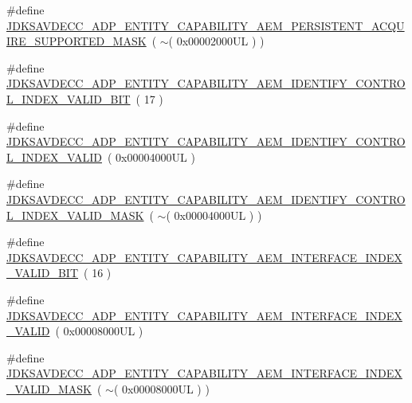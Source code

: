 \begin{DoxyCompactItemize}
\item 
\#define \hyperlink{group__adp__entity__capability_gadef932c36c7432245d44c7ad2d978595}{J\+D\+K\+S\+A\+V\+D\+E\+C\+C\+\_\+\+A\+D\+P\+\_\+\+E\+N\+T\+I\+T\+Y\+\_\+\+C\+A\+P\+A\+B\+I\+L\+I\+T\+Y\+\_\+\+A\+E\+M\+\_\+\+P\+E\+R\+S\+I\+S\+T\+E\+N\+T\+\_\+\+A\+C\+Q\+U\+I\+R\+E\+\_\+\+S\+U\+P\+P\+O\+R\+T\+E\+D\+\_\+\+M\+A\+SK}~( $\sim$( 0x00002000\+U\+L ) )
\item 
\#define \hyperlink{group__adp__entity__capability_gaf16680ff1efc8a1c4d343251b210a128}{J\+D\+K\+S\+A\+V\+D\+E\+C\+C\+\_\+\+A\+D\+P\+\_\+\+E\+N\+T\+I\+T\+Y\+\_\+\+C\+A\+P\+A\+B\+I\+L\+I\+T\+Y\+\_\+\+A\+E\+M\+\_\+\+I\+D\+E\+N\+T\+I\+F\+Y\+\_\+\+C\+O\+N\+T\+R\+O\+L\+\_\+\+I\+N\+D\+E\+X\+\_\+\+V\+A\+L\+I\+D\+\_\+\+B\+IT}~( 17 )
\item 
\#define \hyperlink{group__adp__entity__capability_gaa5c00396d204182da88d5010de83d19a}{J\+D\+K\+S\+A\+V\+D\+E\+C\+C\+\_\+\+A\+D\+P\+\_\+\+E\+N\+T\+I\+T\+Y\+\_\+\+C\+A\+P\+A\+B\+I\+L\+I\+T\+Y\+\_\+\+A\+E\+M\+\_\+\+I\+D\+E\+N\+T\+I\+F\+Y\+\_\+\+C\+O\+N\+T\+R\+O\+L\+\_\+\+I\+N\+D\+E\+X\+\_\+\+V\+A\+L\+ID}~( 0x00004000\+U\+L )
\item 
\#define \hyperlink{group__adp__entity__capability_ga361d96d5c4e60c0e0cfdbef6b82e44b7}{J\+D\+K\+S\+A\+V\+D\+E\+C\+C\+\_\+\+A\+D\+P\+\_\+\+E\+N\+T\+I\+T\+Y\+\_\+\+C\+A\+P\+A\+B\+I\+L\+I\+T\+Y\+\_\+\+A\+E\+M\+\_\+\+I\+D\+E\+N\+T\+I\+F\+Y\+\_\+\+C\+O\+N\+T\+R\+O\+L\+\_\+\+I\+N\+D\+E\+X\+\_\+\+V\+A\+L\+I\+D\+\_\+\+M\+A\+SK}~( $\sim$( 0x00004000\+U\+L ) )
\item 
\#define \hyperlink{group__adp__entity__capability_ga47da285cb2190efe4f7c862b60c2f99b}{J\+D\+K\+S\+A\+V\+D\+E\+C\+C\+\_\+\+A\+D\+P\+\_\+\+E\+N\+T\+I\+T\+Y\+\_\+\+C\+A\+P\+A\+B\+I\+L\+I\+T\+Y\+\_\+\+A\+E\+M\+\_\+\+I\+N\+T\+E\+R\+F\+A\+C\+E\+\_\+\+I\+N\+D\+E\+X\+\_\+\+V\+A\+L\+I\+D\+\_\+\+B\+IT}~( 16 )
\item 
\#define \hyperlink{group__adp__entity__capability_ga049df3d92451cf4e015824e6c2ca641d}{J\+D\+K\+S\+A\+V\+D\+E\+C\+C\+\_\+\+A\+D\+P\+\_\+\+E\+N\+T\+I\+T\+Y\+\_\+\+C\+A\+P\+A\+B\+I\+L\+I\+T\+Y\+\_\+\+A\+E\+M\+\_\+\+I\+N\+T\+E\+R\+F\+A\+C\+E\+\_\+\+I\+N\+D\+E\+X\+\_\+\+V\+A\+L\+ID}~( 0x00008000\+U\+L )
\item 
\#define \hyperlink{group__adp__entity__capability_ga759f2e88a113892e0074a69928046372}{J\+D\+K\+S\+A\+V\+D\+E\+C\+C\+\_\+\+A\+D\+P\+\_\+\+E\+N\+T\+I\+T\+Y\+\_\+\+C\+A\+P\+A\+B\+I\+L\+I\+T\+Y\+\_\+\+A\+E\+M\+\_\+\+I\+N\+T\+E\+R\+F\+A\+C\+E\+\_\+\+I\+N\+D\+E\+X\+\_\+\+V\+A\+L\+I\+D\+\_\+\+M\+A\+SK}~( $\sim$( 0x00008000\+U\+L ) )

\end{DoxyCompactItemize}
